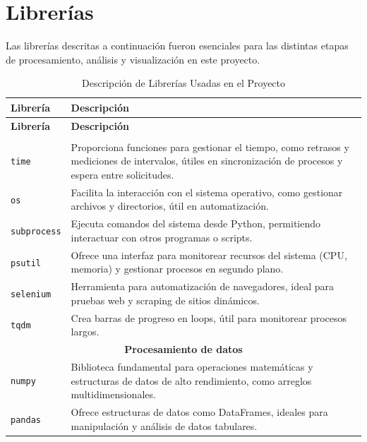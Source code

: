 \section{Librerías}
Las librerías descritas a continuación fueron esenciales para las distintas etapas de procesamiento, análisis y visualización en este proyecto.

\begin{longtable}{p{4cm} p{11cm}}
    \caption{Descripción de Librerías Usadas en el Proyecto} \\ %
    \hline
    \textbf{Librería} & \textbf{Descripción} \\
    \hline
    \endfirsthead
    
    \hline
    \textbf{Librería} & \textbf{Descripción} \\
    \hline
    \endhead
    
    \hline
    \endfoot
    
    \hline
    \endlastfoot
    
    \multicolumn{2}{c}{\textbf{Web Scraping y automatización}} \\
    \hline
    \texttt{time} & Proporciona funciones para gestionar el tiempo, como retrasos y mediciones de intervalos, útiles en sincronización de procesos y espera entre solicitudes. \\
    \texttt{os} & Facilita la interacción con el sistema operativo, como gestionar archivos y directorios, útil en automatización. \\
    \texttt{subprocess} & Ejecuta comandos del sistema desde Python, permitiendo interactuar con otros programas o scripts. \\
    \texttt{psutil} & Ofrece una interfaz para monitorear recursos del sistema (CPU, memoria) y gestionar procesos en segundo plano. \\
    \texttt{selenium} & Herramienta para automatización de navegadores, ideal para pruebas web y scraping de sitios dinámicos. \\
    \texttt{tqdm} & Crea barras de progreso en loops, útil para monitorear procesos largos. \\
    \hline
    
    \multicolumn{2}{c}{\textbf{Procesamiento de datos}} \\
    \hline
    \texttt{numpy} & Biblioteca fundamental para operaciones matemáticas y estructuras de datos de alto rendimiento, como arreglos multidimensionales. \\
    \texttt{pandas} & Ofrece estructuras de datos como DataFrames, ideales para manipulación y análisis de datos tabulares. \\
    \hline
    

\end{longtable}
